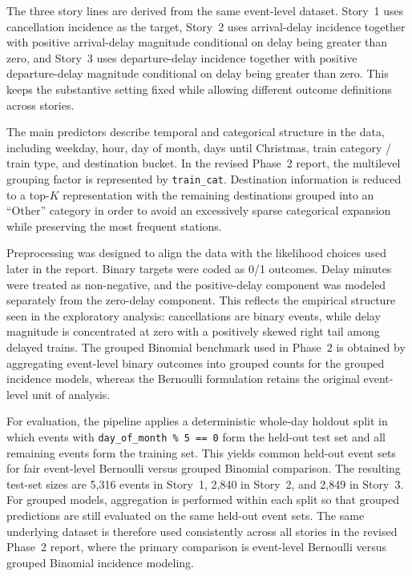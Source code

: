\documentclass[12pt]{article}
\begin{document}
The three story lines are derived from the same event-level dataset. Story~1 uses cancellation incidence as the target, Story~2 uses arrival-delay incidence together with positive arrival-delay magnitude conditional on delay being greater than zero, and Story~3 uses departure-delay incidence together with positive departure-delay magnitude conditional on delay being greater than zero. This keeps the substantive setting fixed while allowing different outcome definitions across stories.

The main predictors describe temporal and categorical structure in the data, including weekday, hour, day of month, days until Christmas, train category / train type, and destination bucket. In the revised Phase~2 report, the multilevel grouping factor is represented by \texttt{train\_cat}. Destination information is reduced to a top-\(K\) representation with the remaining destinations grouped into an ``Other'' category in order to avoid an excessively sparse categorical expansion while preserving the most frequent stations.

Preprocessing was designed to align the data with the likelihood choices used later in the report. Binary targets were coded as 0/1 outcomes. Delay minutes were treated as non-negative, and the positive-delay component was modeled separately from the zero-delay component. This reflects the empirical structure seen in the exploratory analysis: cancellations are binary events, while delay magnitude is concentrated at zero with a positively skewed right tail among delayed trains. The grouped Binomial benchmark used in Phase~2 is obtained by aggregating event-level binary outcomes into grouped counts for the grouped incidence models, whereas the Bernoulli formulation retains the original event-level unit of analysis.

For evaluation, the pipeline applies a deterministic whole-day holdout split in which events with \texttt{day\_of\_month \% 5 == 0} form the held-out test set and all remaining events form the training set. This yields common held-out event sets for fair event-level Bernoulli versus grouped Binomial comparison. The resulting test-set sizes are 5{,}316 events in Story~1, 2{,}840 in Story~2, and 2{,}849 in Story~3. For grouped models, aggregation is performed within each split so that grouped predictions are still evaluated on the same held-out event sets. The same underlying dataset is therefore used consistently across all stories in the revised Phase~2 report, where the primary comparison is event-level Bernoulli versus grouped Binomial incidence modeling.
\end{document}
